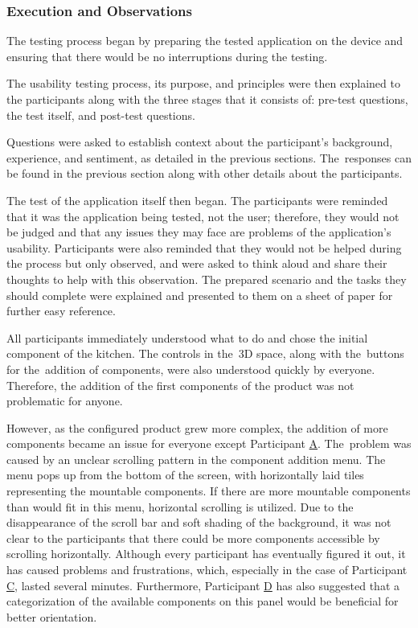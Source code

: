 \subsubsection{Execution and Observations}

The testing process began by preparing the tested application on the device and ensuring that there would be no interruptions during the testing.

The usability testing process, its purpose, and principles were then explained to the participants along with the three stages that it consists of: pre-test questions, the test itself, and post-test questions.

Questions were asked to establish context about the participant's background, experience, and sentiment, as detailed in the previous sections. The~responses can be found in the previous section along with other details about the participants.

The test of the application itself then began. The participants were reminded that it was the application being tested, not the user; therefore, they would not be judged and that any issues they may face are problems of the application's usability. Participants were also reminded that they would not be helped during the process but only observed, and were asked to think aloud and share their thoughts to help with this observation. The prepared scenario and the tasks they should complete were explained and presented to them on a sheet of paper for further easy reference. 

All participants immediately understood what to do and chose the initial component of the kitchen. The controls in the~3D space, along with the~buttons for the~addition of components, were also understood quickly by everyone. Therefore, the addition of the first components of the product was not problematic for anyone. 

However, as the configured product grew more complex, the addition of more components became an issue for everyone except Participant \hyperref[itm:A]{A}. The~problem was caused by an unclear scrolling pattern in the component addition menu. The menu pops up from the bottom of the screen, with horizontally laid tiles representing the mountable components. If there are more mountable components than would fit in this menu, horizontal scrolling is utilized. Due to the disappearance of the scroll bar and soft shading of the background, it was not clear to the participants that there could be more components accessible by scrolling horizontally. Although every participant has eventually figured it out, it has caused problems and frustrations, which, especially in the case of Participant \hyperref[itm:C]{C}, lasted several minutes. Furthermore, Participant \hyperref[itm:D]{D} has also suggested that a categorization of the available components on this panel would be beneficial for better orientation. 

